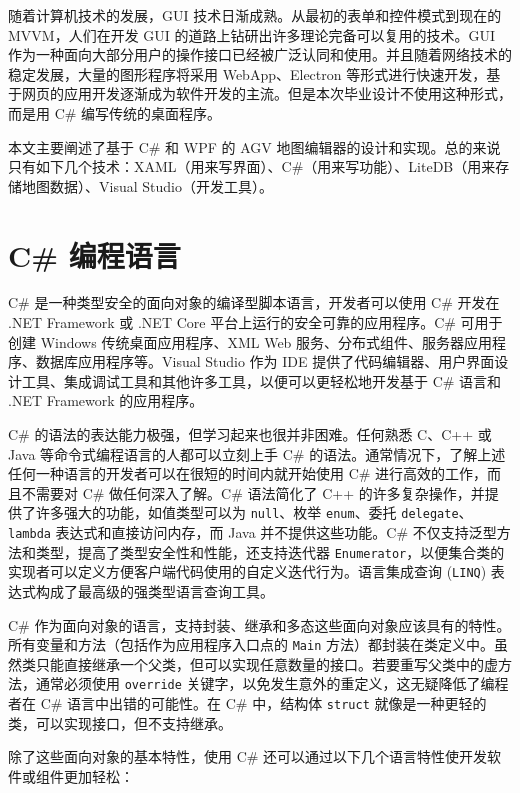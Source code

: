
随着计算机技术的发展，GUI 技术日渐成熟。从最初的表单和控件模式到现在的 MVVM，人们在开发 GUI 的道路上钻研出许多理论完备可以复用的技术。GUI 作为一种面向大部分用户的操作接口已经被广泛认同和使用。并且随着网络技术的稳定发展，大量的图形程序将采用 WebApp、Electron 等形式进行快速开发，基于网页的应用开发逐渐成为软件开发的主流。但是本次毕业设计不使用这种形式，而是用 C\# 编写传统的桌面程序。

本文主要阐述了基于 C\# 和 WPF 的 AGV 地图编辑器的设计和实现。总的来说只有如下几个技术：XAML（用来写界面）、C\#（用来写功能）、LiteDB（用来存储地图数据）、Visual Studio（开发工具）。

\section{C\# 编程语言}

C\# 是一种类型安全的面向对象的编译型脚本语言，开发者可以使用 C\# 开发在 .NET Framework 或 .NET Core 平台上运行的安全可靠的应用程序。C\# 可用于创建 Windows 传统桌面应用程序、XML Web 服务、分布式组件、服务器应用程序、数据库应用程序等。Visual Studio 作为 IDE 提供了代码编辑器、用户界面设计工具、集成调试工具和其他许多工具，以便可以更轻松地开发基于 C\# 语言和 .NET Framework 的应用程序。

C\# 的语法的表达能力极强，但学习起来也很并非困难。任何熟悉 C、C++ 或 Java 等命令式编程语言的人都可以立刻上手 C\# 的语法。通常情况下，了解上述任何一种语言的开发者可以在很短的时间内就开始使用 C\# 进行高效的工作，而且不需要对 C\# 做任何深入了解。C\# 语法简化了 C++ 的许多复杂操作，并提供了许多强大的功能，如值类型可以为 \texttt{null}、枚举 \texttt{enum}、委托 \texttt{delegate}、\texttt{lambda} 表达式和直接访问内存，而 Java 并不提供这些功能。C\# 不仅支持泛型方法和类型，提高了类型安全性和性能，还支持迭代器 \texttt{Enumerator}，以便集合类的实现者可以定义方便客户端代码使用的自定义迭代行为。语言集成查询 (\texttt{LINQ}) 表达式构成了最高级的强类型语言查询工具。

C\# 作为面向对象的语言，支持封装、继承和多态这些面向对象应该具有的特性。所有变量和方法（包括作为应用程序入口点的 \texttt{Main} 方法）都封装在类定义中。虽然类只能直接继承一个父类，但可以实现任意数量的接口。若要重写父类中的虚方法，通常必须使用 \texttt{override} 关键字，以免发生意外的重定义，这无疑降低了编程者在 C\# 语言中出错的可能性。在 C\# 中，结构体 \texttt{struct} 就像是一种更轻的类，可以实现接口，但不支持继承。

除了这些面向对象的基本特性，使用 C\# 还可以通过以下几个语言特性使开发软件或组件更加轻松：

